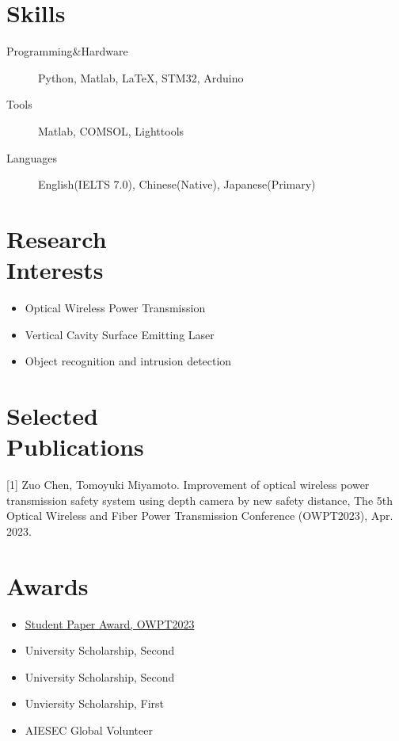 \documentclass{mycv}
\begin{document}
\section{Skills}

\begin{description}
  \item[Programming\&Hardware] Python, Matlab, \LaTeX, STM32, Arduino
  \item[Tools] Matlab, COMSOL, Lighttools
  \item[Languages] English(IELTS 7.0), Chinese(Native), Japanese(Primary)
\end{description}

\section{Research \\ Interests}

\begin{itemize}
  \item Optical Wireless Power Transmission
  \item Vertical Cavity Surface Emitting Laser
  \item Object recognition and intrusion detection
\end{itemize}

\section{Selected \\ Publications}%

[1] Zuo Chen, Tomoyuki Miyamoto. Improvement of optical wireless power transmission safety system using depth camera by new safety distance, The 5th Optical Wireless and Fiber Power Transmission Conference (OWPT2023), Apr. 2023.





\section{Awards}

\begin{itemize}
  \item \href{https://www.first.iir.titech.ac.jp/news/2023/detail_1455.html}{Student Paper Award, OWPT2023} 
  \item University Scholarship, Second 
  \item University Scholarship, Second 
  \item Unviersity Scholarship, First 
  \item AIESEC Global Volunteer 
\end{itemize}
\end{document}
